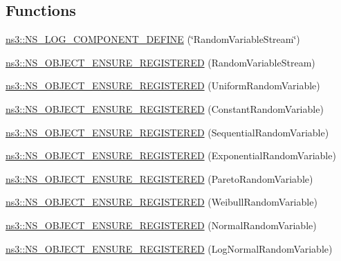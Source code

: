 \subsection*{Functions}
\begin{DoxyCompactItemize}
\item 
\hyperlink{namespacens3_a40c75c0c3f3b0f27102774f45f7a6d3c}{ns3\+::\+N\+S\+\_\+\+L\+O\+G\+\_\+\+C\+O\+M\+P\+O\+N\+E\+N\+T\+\_\+\+D\+E\+F\+I\+NE} (\char`\"{}Random\+Variable\+Stream\char`\"{})
\item 
\hyperlink{namespacens3_a5a4175e58fdffef8214f48d36d287ddd}{ns3\+::\+N\+S\+\_\+\+O\+B\+J\+E\+C\+T\+\_\+\+E\+N\+S\+U\+R\+E\+\_\+\+R\+E\+G\+I\+S\+T\+E\+R\+ED} (Random\+Variable\+Stream)
\item 
\hyperlink{namespacens3_a41b0fc27d787f530fb73419aa2b57fa5}{ns3\+::\+N\+S\+\_\+\+O\+B\+J\+E\+C\+T\+\_\+\+E\+N\+S\+U\+R\+E\+\_\+\+R\+E\+G\+I\+S\+T\+E\+R\+ED} (Uniform\+Random\+Variable)
\item 
\hyperlink{namespacens3_a2db54caede2f542f13b15b5b4b261e12}{ns3\+::\+N\+S\+\_\+\+O\+B\+J\+E\+C\+T\+\_\+\+E\+N\+S\+U\+R\+E\+\_\+\+R\+E\+G\+I\+S\+T\+E\+R\+ED} (Constant\+Random\+Variable)
\item 
\hyperlink{namespacens3_a7dbad7d0a6bb227863a208a1f1b8ef26}{ns3\+::\+N\+S\+\_\+\+O\+B\+J\+E\+C\+T\+\_\+\+E\+N\+S\+U\+R\+E\+\_\+\+R\+E\+G\+I\+S\+T\+E\+R\+ED} (Sequential\+Random\+Variable)
\item 
\hyperlink{namespacens3_aa95a5f7ee55359695baf05d038416f83}{ns3\+::\+N\+S\+\_\+\+O\+B\+J\+E\+C\+T\+\_\+\+E\+N\+S\+U\+R\+E\+\_\+\+R\+E\+G\+I\+S\+T\+E\+R\+ED} (Exponential\+Random\+Variable)
\item 
\hyperlink{namespacens3_a3e262c13da50883c9b5cdb0b880f459d}{ns3\+::\+N\+S\+\_\+\+O\+B\+J\+E\+C\+T\+\_\+\+E\+N\+S\+U\+R\+E\+\_\+\+R\+E\+G\+I\+S\+T\+E\+R\+ED} (Pareto\+Random\+Variable)
\item 
\hyperlink{namespacens3_af651c635a2e4c3c2075e8fd3782f6b68}{ns3\+::\+N\+S\+\_\+\+O\+B\+J\+E\+C\+T\+\_\+\+E\+N\+S\+U\+R\+E\+\_\+\+R\+E\+G\+I\+S\+T\+E\+R\+ED} (Weibull\+Random\+Variable)
\item 
\hyperlink{namespacens3_aa4856d81fe7fc95b39cb7cc2e5a56ca6}{ns3\+::\+N\+S\+\_\+\+O\+B\+J\+E\+C\+T\+\_\+\+E\+N\+S\+U\+R\+E\+\_\+\+R\+E\+G\+I\+S\+T\+E\+R\+ED} (Normal\+Random\+Variable)
\item 
\hyperlink{namespacens3_a8af9d0b3d6c7f9a44808dec6e5117a8a}{ns3\+::\+N\+S\+\_\+\+O\+B\+J\+E\+C\+T\+\_\+\+E\+N\+S\+U\+R\+E\+\_\+\+R\+E\+G\+I\+S\+T\+E\+R\+ED} (Log\+Normal\+Random\+Variable)
\item 

\end{DoxyCompactItemize}
